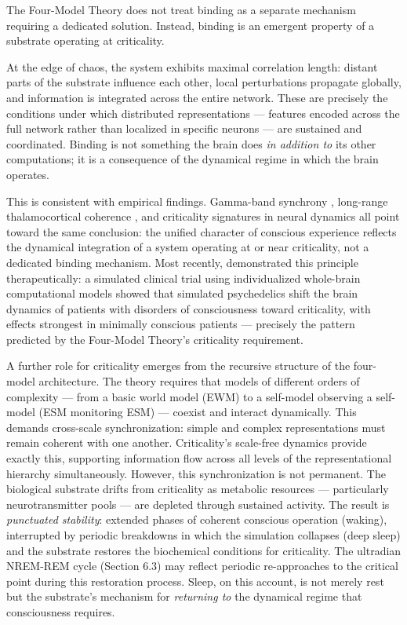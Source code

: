 \documentclass[12pt]{article}
\begin{document}
The Four-Model Theory does not treat binding as a separate mechanism requiring a dedicated solution. Instead, binding is an emergent property of a substrate operating at criticality.

At the edge of chaos, the system exhibits maximal correlation length: distant parts of the substrate influence each other, local perturbations propagate globally, and information is integrated across the entire network. These are precisely the conditions under which distributed representations --- features encoded across the full network rather than localized in specific neurons --- are sustained and coordinated. Binding is not something the brain does \emph{in addition to} its other computations; it is a consequence of the dynamical regime in which the brain operates.

This is consistent with empirical findings. Gamma-band synchrony \citep{Gray1989,Rodriguez1999,Fries2005,Fries2015}, long-range thalamocortical coherence \citep{Llinas1993,Llinas1998,Chowdhury2026}, and criticality signatures in neural dynamics \citep{Beggs2003,Tagliazucchi2012,TuckerLuuFriston2025} all point toward the same conclusion: the unified character of conscious experience reflects the dynamical integration of a system operating at or near criticality, not a dedicated binding mechanism. Most recently, \citet{Alnagger2026} demonstrated this principle therapeutically: a simulated clinical trial using individualized whole-brain computational models showed that simulated psychedelics shift the brain dynamics of patients with disorders of consciousness toward criticality, with effects strongest in minimally conscious patients --- precisely the pattern predicted by the Four-Model Theory's criticality requirement.

A further role for criticality emerges from the recursive structure of the four-model architecture. The theory requires that models of different orders of complexity --- from a basic world model (EWM) to a self-model observing a self-model (ESM monitoring ESM) --- coexist and interact dynamically. This demands cross-scale synchronization: simple and complex representations must remain coherent with one another. Criticality's scale-free dynamics provide exactly this, supporting information flow across all levels of the representational hierarchy simultaneously. However, this synchronization is not permanent. The biological substrate drifts from criticality as metabolic resources --- particularly neurotransmitter pools --- are depleted through sustained activity. The result is \emph{punctuated stability}: extended phases of coherent conscious operation (waking), interrupted by periodic breakdowns in which the simulation collapses (deep sleep) and the substrate restores the biochemical conditions for criticality. The ultradian NREM-REM cycle (Section 6.3) may reflect periodic re-approaches to the critical point during this restoration process. Sleep, on this account, is not merely rest but the substrate's mechanism for \emph{returning to} the dynamical regime that consciousness requires.
\end{document}
